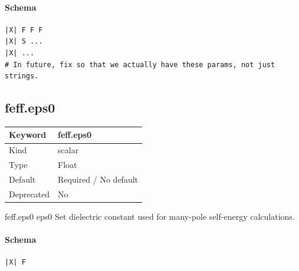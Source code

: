 \documentclass[11pt]{article}
\begin{document}
{{{\paragraph{Schema}
\begin{Verbatim}
|X| F F F
|X| S ...
|X| ...
# In future, fix so that we actually have these params, not just strings.
\end{Verbatim}

\subsection{feff.eps0}
\label{kw:feff-eps0}
\begin{longtable}{|p{1.5in}|p{4.5in}|}
\hline
Keyword & feff.eps0 \\
\hline
Kind & scalar \\
\hline
Type & Float \\
\hline
Default & Required / No default \\
\hline
Deprecated & No \\
\hline
\end{longtable}
 feff.eps0{ eps0 }
 Set dielectric constant used for many-pole self-energy calculations.

\paragraph{Schema}
\begin{Verbatim}
|X| F
\end{Verbatim}

}}}
\end{document}
